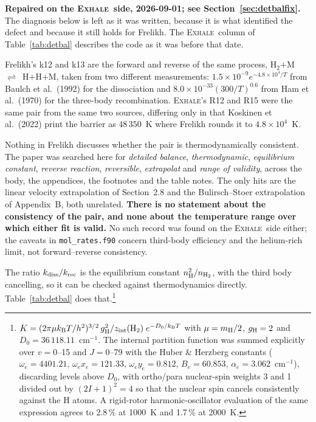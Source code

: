\documentclass[english,a4paper]{my_memo}
\newcommand{\EXHALE}{\textsc{Exhale}}
\newcommand{\Htwo}{\ensuremath{\mathrm{H}_2}}
\begin{document}
\textbf{Repaired on the \EXHALE\ side, 2026-09-01; see
Section~\ref{sec:detbalfix}.} The diagnosis below is left as it was written,
because it is what identified the defect and because it still holds for
Frelikh. The \EXHALE\ column of Table~\ref{tab:detbal} describes the code as it
was before that date.

Frelikh's k12 and k13 are the forward and reverse of the same process,
\Htwo$ + $M~$\rightleftharpoons$~H$ + $H$ + $M, taken from two different
measurements: $1.5\times10^{-9}e^{-4.8\times10^{4}/T}$ from Baulch et al.\
(1992) for the dissociation and
$8.0\times10^{-33}(300/T)^{0.6}$ from Ham et al.\ (1970) for the three-body
recombination. \EXHALE's R12 and R15 were the same pair from the same two
sources, differing only in that Koskinen et al.\ (2022) print the barrier as
$48\,350$~K where Frelikh rounds it to $4.8\times10^{4}$~K.

Nothing in Frelikh discusses whether the pair is thermodynamically consistent.
The paper was searched here for \emph{detailed balance}, \emph{thermodynamic},
\emph{equilibrium constant}, \emph{reverse reaction}, \emph{reversible},
\emph{extrapolat} and \emph{range of validity}, across the body, the
appendices, the footnotes and the table notes. The only hits are the linear
velocity extrapolation of Section~2.8 and the Bulirsch--Stoer extrapolation of
Appendix~B, both unrelated. \textbf{There is no statement about the
consistency of the pair, and none about the temperature range over which
either fit is valid.} No such record was found on the \EXHALE\ side either;
the caveats in \texttt{mol\_rates.f90} concern third-body efficiency and the
helium-rich limit, not forward--reverse consistency.

The ratio $k_{\rm diss}/k_{\rm rec}$ is the equilibrium constant
$n_{\rm H}^2/n_{\Htwo}$, with the third body cancelling, so it can be checked
against thermodynamics directly. Table~\ref{tab:detbal} does that.\footnote{%
$K = (2\pi\mu k_{\rm B}T/h^2)^{3/2}\,g_{\rm H}^2/z_{\rm int}(\Htwo)\;
e^{-D_0/k_{\rm B}T}$ with $\mu = m_{\rm H}/2$, $g_{\rm H} = 2$ and
$D_0 = 36\,118.11$~cm$^{-1}$. The internal partition function was summed
explicitly over $v = 0$--15 and $J = 0$--79 with the Huber \& Herzberg
constants ($\omega_e = 4401.21$, $\omega_ex_e = 121.33$,
$\omega_ey_e = 0.812$, $B_e = 60.853$, $\alpha_e = 3.062$~cm$^{-1}$),
discarding levels above $D_0$, with ortho/para nuclear-spin weights 3 and 1
divided out by $(2I+1)^2 = 4$ so that the nuclear spin cancels consistently
against the H atoms. A rigid-rotor harmonic-oscillator evaluation of the same
expression agrees to 2.8\,\% at 1000~K and 1.7\,\% at 2000~K.}
\end{document}
